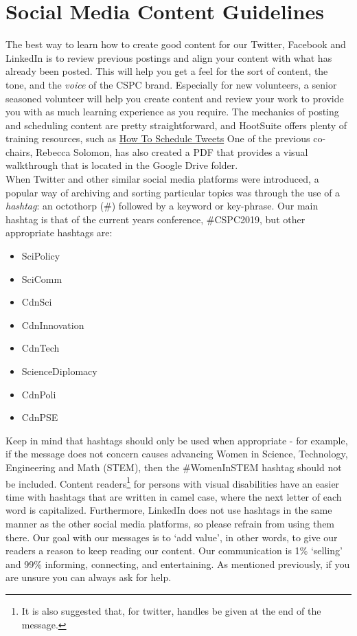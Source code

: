 \documentclass[11pt]{amsart}
\begin{document}
\section{Social Media Content Guidelines}
The best way to learn how to create good content for our Twitter, Facebook and LinkedIn is to review previous postings and align your content with what has already been posted.
This will help you get a feel for the sort of content, the tone, and the \emph{voice} of the CSPC brand.
Especially for new volunteers, a senior seasoned volunteer will help you create content and review your work to provide you with as much learning experience as you require.
The mechanics of posting and scheduling content are pretty straightforward, and HootSuite offers plenty of training resources, such as \href{https://blog.hootsuite.com/how-to-schedule-tweets/}{How To Schedule Tweets}
One of the previous co-chairs, Rebecca Solomon, has also created a PDF that provides a visual walkthrough that is located in the Google Drive folder.\\
\indent When Twitter and other similar social media platforms were introduced, a popular way of archiving and sorting particular topics was through the use of a \emph{hashtag}: an octothorp (\#) followed by a keyword or key-phrase.
Our main hashtag is that of the current years conference, \#CSPC2019, but other appropriate hashtags are:
\begin{itemize}
\item SciPolicy
\item SciComm
\item CdnSci
\item CdnInnovation
\item CdnTech
\item ScienceDiplomacy
\item CdnPoli
\item CdnPSE
\end{itemize}
Keep in mind that hashtags should only be used when appropriate - for example, if the message does not concern causes advancing Women in Science, Technology, Engineering and Math (STEM), then the \#WomenInSTEM hashtag should not be included.
Content readers\footnote{It is also suggested that, for twitter, handles be given at the end of the message.} for persons with visual disabilities have an easier time with hashtags that are written in camel case, where the next letter of each word is capitalized.
Furthermore, LinkedIn does not use hashtags in the same manner as the other social media platforms, so please refrain from using them there.
Our goal with our messages is to `add value', in other words, to give our readers a reason to keep reading our content.
Our communication is 1\% `selling' and 99\% informing, connecting, and entertaining.
As mentioned previously, if you are unsure you can always ask for help.
\end{document}
